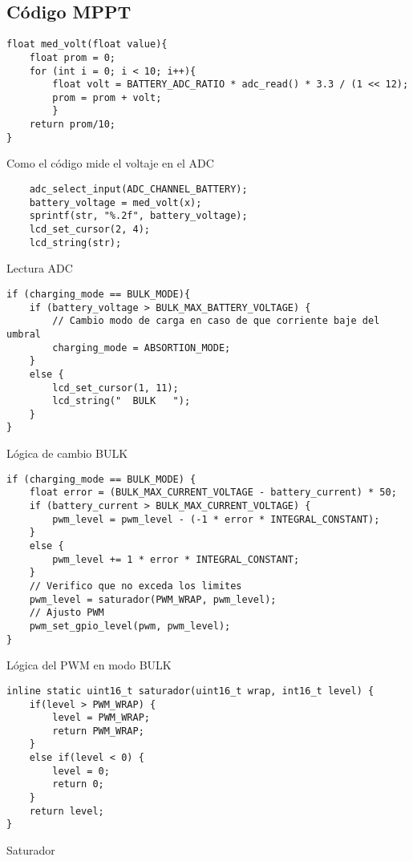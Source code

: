 \subsection{Código MPPT}
\begin{listing}[H]
\begin{verbatim}
float med_volt(float value){
    float prom = 0;
    for (int i = 0; i < 10; i++){
        float volt = BATTERY_ADC_RATIO * adc_read() * 3.3 / (1 << 12);
        prom = prom + volt;
        }
    return prom/10;
}    
\end{verbatim}
\caption{Como el código mide el voltaje en el ADC}
\label{Listing 1}
\end{listing}

\begin{listing}[H]
\begin{verbatim}
    adc_select_input(ADC_CHANNEL_BATTERY);
    battery_voltage = med_volt(x);
    sprintf(str, "%.2f", battery_voltage);
    lcd_set_cursor(2, 4);
    lcd_string(str);
\end{verbatim}
\caption{Lectura ADC}
\label{Listing 2}
\end{listing}


\begin{listing}[H]
\begin{verbatim}
if (charging_mode == BULK_MODE){
    if (battery_voltage > BULK_MAX_BATTERY_VOLTAGE) {
        // Cambio modo de carga en caso de que corriente baje del umbral
        charging_mode = ABSORTION_MODE;
    }
    else {
        lcd_set_cursor(1, 11);
        lcd_string("  BULK   ");
    }
}
\end{verbatim}
\caption{Lógica de cambio BULK}
\label{Listing 3}
\end{listing}

\begin{listing}[H]
\begin{verbatim}
if (charging_mode == BULK_MODE) {
    float error = (BULK_MAX_CURRENT_VOLTAGE - battery_current) * 50;
    if (battery_current > BULK_MAX_CURRENT_VOLTAGE) {
        pwm_level = pwm_level - (-1 * error * INTEGRAL_CONSTANT);
    }
    else {
        pwm_level += 1 * error * INTEGRAL_CONSTANT;
    }
    // Verifico que no exceda los limites
    pwm_level = saturador(PWM_WRAP, pwm_level);
    // Ajusto PWM
    pwm_set_gpio_level(pwm, pwm_level);
}
\end{verbatim}
\caption{Lógica del PWM en modo BULK}
\label{Listing 4}
\end{listing}

\begin{listing}[H]
\begin{verbatim}
inline static uint16_t saturador(uint16_t wrap, int16_t level) {
    if(level > PWM_WRAP) {
        level = PWM_WRAP;
        return PWM_WRAP;
    }
    else if(level < 0) {
        level = 0;
        return 0;
    }
    return level;
}
\end{verbatim}
\caption{Saturador}
\label{Listing 5}
\end{listing}

